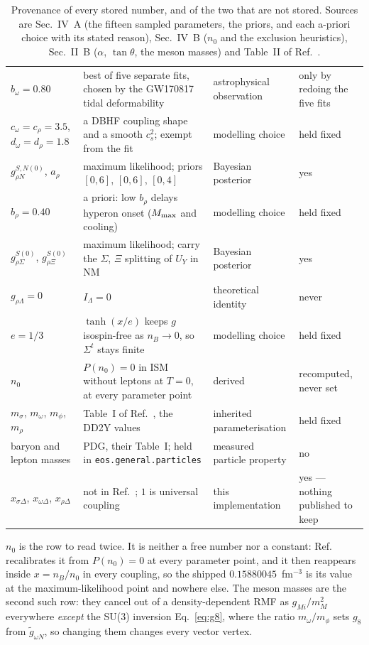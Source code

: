 \documentclass[aps,prc,onecolumn,superscriptaddress,nofootinbib,10pt]{revtex4-2}
\newcommand{\nB}{n_B}
\newcommand{\nzero}{n_0}
\newcommand{\Sigmat}{\Sigma^{t}}
\begin{document}
\begin{table}[h]
\begin{tabular}{@{}p{}p{}p{}p{}@{}}
$b_\omega = 0.80$
  & best of five separate fits, chosen by the GW170817 tidal deformability
  & astrophysical observation & only by redoing the five fits \\
$c_\omega = c_\rho = 3.5$, $d_\omega = d_\rho = 1.8$
  & a DBHF coupling shape and a smooth $c_s^2$; exempt from the fit
  & modelling choice & held fixed \\
$g^{S,N(0)}_{\rho N}$, $a_\rho$
  & maximum likelihood; priors $[0,6]$, $[0,6]$, $[0,4]$
  & Bayesian posterior & yes \\
$b_\rho = 0.40$
  & a priori: low $b_\rho$ delays hyperon onset ($M_{\rm max}$ and cooling)
  & modelling choice & held fixed \\
$g^{S(0)}_{\rho\Sigma}$, $g^{S(0)}_{\rho\Xi}$
  & maximum likelihood; carry the $\Sigma$, $\Xi$ splitting of $U_Y$ in NM
  & Bayesian posterior & yes \\
$g_{\rho\Lambda} = 0$
  & $I_\Lambda = 0$
  & theoretical identity & never \\
$e = 1/3$
  & $\tanh(x/e)$ keeps $g$ isospin-free as $\nB \to 0$, so $\Sigmat$ stays finite
  & modelling choice & held fixed \\
$\nzero$
  & $P(\nzero) = 0$ in ISM without leptons at $T = 0$, at every parameter point
  & derived & recomputed, never set \\
$m_\sigma$, $m_\omega$, $m_\phi$, $m_\rho$
  & Table~I of Ref.~\cite{Frohaug2025}, the DD2Y values
  & inherited parameterisation & held fixed \\
baryon and lepton masses
  & PDG, their Table~I; held in \texttt{eos.general.particles}
  & measured particle property & no \\
$x_{\sigma\Delta}$, $x_{\omega\Delta}$, $x_{\rho\Delta}$
  & not in Ref.~\cite{Frohaug2025}; $1$ is universal coupling
  & this implementation & yes --- nothing published to keep \\
\bottomrule
\end{tabular}
\caption{Provenance of every stored number, and of the two that are not stored.
Sources are Sec.~IV~A (the fifteen sampled parameters, the priors, and each
a-priori choice with its stated reason), Sec.~IV~B ($\nzero$ and the exclusion
heuristics), Sec.~II~B ($\alpha$, $\tan\theta$, the meson masses) and Table~II
of Ref.~\cite{Frohaug2025}.}
\label{tab:provenance}
\end{table}

$\nzero$ is the row to read twice. It is neither a free number nor a constant:
Ref.~\cite{Frohaug2025} recalibrates it from $P(\nzero) = 0$ at every parameter
point, and it then reappears inside $x = \nB/\nzero$ in every coupling, so the
shipped $0.15880045$~fm$^{-3}$ is its value at the maximum-likelihood point and
nowhere else. The meson masses are the second such row: they cancel out of a
density-dependent RMF as $g_{Mi}/m_M^2$ everywhere \emph{except} the SU(3)
inversion Eq.~\eqref{eq:g8}, where the ratio $m_\omega/m_\phi$ sets $g_8$ from
$\tilde{g}_{\omega N}$, so changing them changes every vector vertex.
\end{document}
